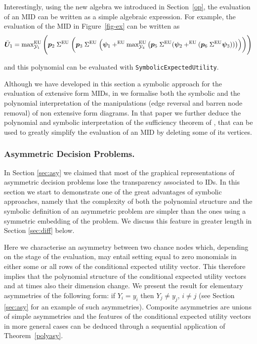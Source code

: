 \begin{example}
Interestingly, using the new algebra we introduced in Section~\ref{op}, the evaluation of an MID can be written as a simple algebraic expression. For example, the evaluation of the MID in Figure~\ref{fig-ex} can be written as
\begin{equation*}
\bar{\bm{U}}_1=\max\nolimits^{\textnormal{EU}}_{\mathcal{Y}_1}\Bigg(\bm{p}_2 \;\Sigma^{\textnormal{EU}}\;\bigg(\bm{p}_3\;\Sigma^{\textnormal{EU}}\;\Big(\bm{\psi}_1+^{\textnormal{EU}}\max\nolimits^{\textnormal{EU}}_{\mathcal{Y}_4}\big(\bm{p}_5\;\Sigma^{\textnormal{EU}}(\bm{\psi}_2+^{\textnormal{EU}}(\bm{p}_6\;\Sigma^{\textnormal{EU}}\bm{\psi}_3))\big)\Big)\bigg)\Bigg)
\end{equation*}
\end{example}
and this polynomial can be evaluated  with \texttt{SymbolicExpectedUtility}.

Although we have developed in this section a symbolic approach for the evaluation of extensive form MIDs, in \citet{Leonelli2015a} we formalise both the symbolic and the polynomial interpretation of the manipulations (edge reversal and barren node removal) of non extensive form diagrams. In that paper we further deduce the polynomial and symbolic interpretation of the sufficiency theorem of \citet{Smith1989}, that can be used to greatly simplify the evaluation of an MID by deleting some of its vertices.
 
\subsubsection{Asymmetric Decision Problems.}
\label{asymmetry}
In Section \ref{sec:asy} we claimed that most of the graphical representations of asymmetric decision problems lose the transparency associated to IDs. In this section we start to demonstrate one of the great advantages of symbolic approaches, namely that the complexity of both the polynomial structure and the symbolic definition of an asymmetric problem are simpler than the ones using a symmetric embedding of the problem. We discuss  this feature in greater length in Section \ref{sec:diff} below. 

Here we characterise an asymmetry between two chance nodes which, depending on the stage of the evaluation,  may  entail setting equal to zero monomials in either some or all rows of the conditional expected utility vector.  This therefore implies that the polynomial structure of the conditional expected utility vectors and at times also their dimension change. We present the result for elementary asymmetries of the following form: if $Y_i=y_i$ then $Y_j\neq y_j$, $i\neq j$ (see Section \ref{sec:asy} for an example of such asymmetries). Composite asymmetries are unions of simple asymmetries and the features of the conditional expected utility vectors in more general cases can be deduced through a sequential application of Theorem~\ref{polyasy}.


